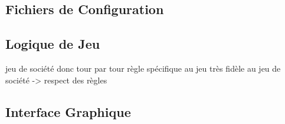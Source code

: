 \documentclass{article}
\begin{document}
    \subsection{Fichiers de Configuration}\label{subsec:fichiers-de-configuration}


    \subsection{Logique de Jeu}\label{subsec:logique-de-jeu}

    jeu de société donc tour par tour
    règle spécifique au jeu
    très fidèle au jeu de société -> respect des règles

    \subsection{Interface Graphique}\label{subsec:interface-graphique}
\end{document}
